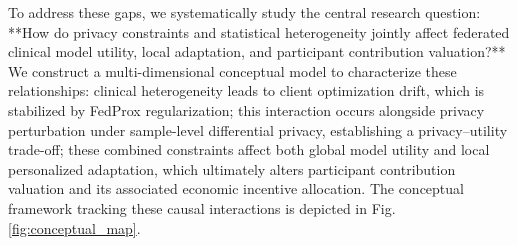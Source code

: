 \documentclass[journal]{IEEEtran}
\begin{document}
To address these gaps, we systematically study the central research question: **How do privacy constraints and statistical heterogeneity jointly affect federated clinical model utility, local adaptation, and participant contribution valuation?** We construct a multi-dimensional conceptual model to characterize these relationships: clinical heterogeneity leads to client optimization drift, which is stabilized by FedProx regularization; this interaction occurs alongside privacy perturbation under sample-level differential privacy, establishing a privacy--utility trade-off; these combined constraints affect both global model utility and local personalized adaptation, which ultimately alters participant contribution valuation and its associated economic incentive allocation. The conceptual framework tracking these causal interactions is depicted in Fig. \ref{fig:conceptual_map}.
\end{document}
